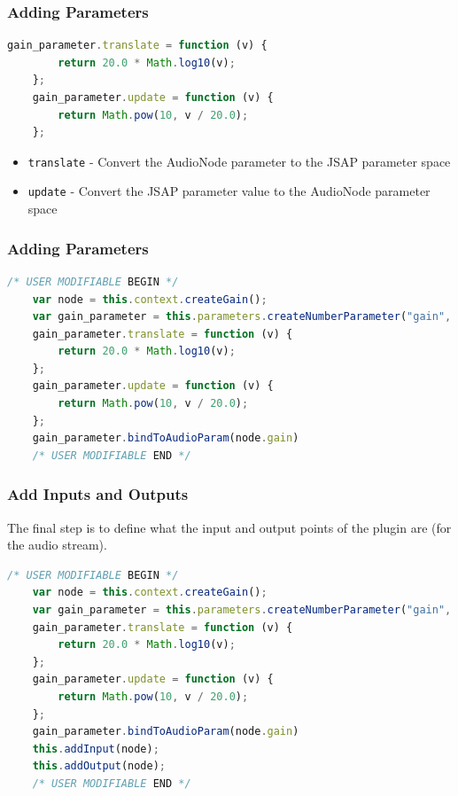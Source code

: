 \documentclass{beamer}
\begin{document}
\begin{frame}[fragile]
\frametitle{Adding Parameters}
\begin{lstlisting}[language=javascript]
    gain_parameter.translate = function (v) {
        return 20.0 * Math.log10(v);
    };
    gain_parameter.update = function (v) {
        return Math.pow(10, v / 20.0);
    };
\end{lstlisting}
\begin{itemize}
\item \texttt{translate} - Convert the AudioNode parameter to the JSAP parameter space
\item \texttt{update} - Convert the JSAP parameter value to the AudioNode parameter space
\end{itemize}
\end{frame}

\begin{frame}[fragile]
\frametitle{Adding Parameters}
\begin{lstlisting}[language=javascript]
    /* USER MODIFIABLE BEGIN */
    var node = this.context.createGain();
    var gain_parameter = this.parameters.createNumberParameter("gain", 0, -12, 12);
    gain_parameter.translate = function (v) {
        return 20.0 * Math.log10(v);
    };
    gain_parameter.update = function (v) {
        return Math.pow(10, v / 20.0);
    };
    gain_parameter.bindToAudioParam(node.gain)
    /* USER MODIFIABLE END */
\end{lstlisting}
\end{frame}

\begin{frame}[fragile]
\frametitle{Add Inputs and Outputs}
The final step is to define what the input and output points of the plugin are (for the audio stream).\\
\begin{lstlisting}[language=javascript]
    /* USER MODIFIABLE BEGIN */
    var node = this.context.createGain();
    var gain_parameter = this.parameters.createNumberParameter("gain", 0, -12, 12);
    gain_parameter.translate = function (v) {
        return 20.0 * Math.log10(v);
    };
    gain_parameter.update = function (v) {
        return Math.pow(10, v / 20.0);
    };
    gain_parameter.bindToAudioParam(node.gain)
    this.addInput(node);
    this.addOutput(node);
    /* USER MODIFIABLE END */
\end{lstlisting}
\end{frame}
\end{document}
